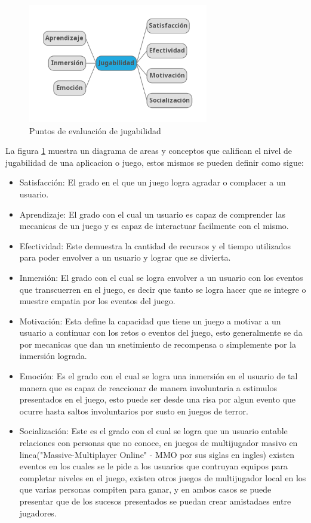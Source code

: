 \begin{figure}
    \centering
    \includegraphics[width=0.7\textwidth]{img/playabilityv2.png}
    \caption{Puntos de evaluación de jugabilidad}
    \label{figure:playability}
\end{figure}

La figura \ref{figure:playability} muestra un diagrama de areas y conceptos que
califican el nivel de jugabilidad de una aplicacion o juego, estos mismos se
pueden definir como sigue:

\begin{itemize}
    \item Satisfacción: El grado en el que un juego logra agradar o complacer a
    un usuario.
    \item Aprendizaje: El grado con el cual un usuario es capaz de comprender
    las mecanicas de un juego y es capaz de interactuar facilmente con el mismo.
    \item Efectividad: Este demuestra la cantidad de recursos y el tiempo
    utilizados para poder envolver a un usuario y lograr que se divierta.
    \item Inmersión: El grado con el cual se logra envolver a un usuario con los
    eventos que transcuerren en el juego, es decir que tanto se logra hacer que
    se integre o muestre empatia por los eventos del juego.
    \item Motivación: Esta define la capacidad que tiene un juego a motivar a un
    usuario a continuar con los retos o eventos del juego, esto generalmente se
    da por mecanicas que dan un snetimiento de recompensa o simplemente por la
    inmersión lograda.
    \item Emoción: Es el grado con el cual se logra una inmersión en el usuario
    de tal manera que es capaz de reaccionar de manera involuntaria a estimulos
    presentados en el juego, esto puede ser desde una risa por algun evento que
    ocurre hasta saltos involuntarios por susto en juegos de terror.
    \item Socialización: Este es el grado con el cual se logra que un usuario
    entable relaciones con personas que no conoce, en juegos de multijugador
    masivo en linea("Massive-Multiplayer Online" - MMO por sus siglas en ingles)
    existen eventos en los cuales se le pide a los usuarios que contruyan
    equipos para completar niveles en el juego, existen otros juegos de
    multijugador local en los que varias personas compiten para ganar, y en
    ambos casos se puede presentar que de los sucesos presentados se puedan
    crear amistadaes entre jugadores.\cite{sanchez2009playability}
\end{itemize}

